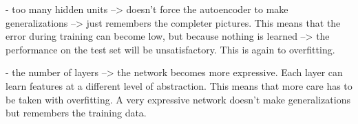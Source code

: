 \documentclass[a4paper,10pt]{article}
\begin{document}
- too many hidden units --> doesn't force the autoencoder to make generalizations --> just remembers the completer pictures. This means that the error during training can become low, but because nothing is learned --> the performance on the test set will be unsatisfactory. This is again to overfitting. 

- the number of layers --> the network becomes more expressive. Each layer can learn features at a different level of abstraction. This means that more care has to be taken with overfitting. A very expressive network doesn't make generalizations but remembers the training data. 






%
\end{document}
